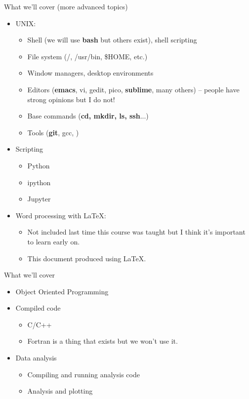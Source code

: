 \documentclass[10pt]{beamer}
\begin{document}
\begin{frame}[fragile]{What we'll cover (more advanced topics)}

    \begin{itemize}
    	\item UNIX:
    	\begin{itemize}
    		\item Shell (we will use \textbf{bash} but others exist), shell scripting
    		\item File system (/, /usr/bin, \$HOME, etc.)
    		\item Window managers, desktop environments
    		\item Editors (\textbf{emacs}, vi, gedit, pico, \textbf{sublime}, many others) -- people have strong opinions but I do not!
    		\item Base commands (\textbf{cd, mkdir, ls, ssh}...)
		\item Tools (\textbf{git}, gcc, )
    	\end{itemize}
    	\item Scripting
    	\begin{itemize}
    		\item Python
    		\item ipython
    		\item Jupyter
    	\end{itemize}
	\item Word processing with \LaTeX:
	\begin{itemize}
		\item Not included last time this course was taught but I think it's important to learn early on.
		\item This document produced using \LaTeX.
	\end{itemize}
	
	 \end{itemize}
\end{frame}	

\begin{frame}[fragile]{What we'll cover}
    \begin{itemize}	
    	\item Object Oriented Programming
    	\item Compiled code
    	\begin{itemize}
    		\item C/C++
    		\item Fortran is a thing that exists but we won't use it.
    	\end{itemize}		
    	
    	\item Data analysis
	\begin{itemize}
		\item Compiling and running analysis code
    		\item Analysis and plotting
    	\end{itemize}		
    
    \end{itemize}

\end{frame}
\end{document}
